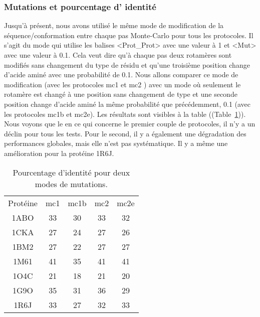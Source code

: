    \subsubsection{Mutations et pourcentage d' identité} 
Jusqu'à présent, nous avons utilisé le même mode de modification de la séquence/conformation entre chaque pas Monte-Carlo pour tous les protocoles. Il s'agit du mode qui utilise les balises <Prot\_Prot> avec une valeur à 1 et <Mut> avec une valeur à 0.1. Cela veut dire qu'à chaque pas deux rotamères sont modifiés sans changement du type de résidu et qu'une troisième position change d'acide aminé avec une probabilité de 0.1. Nous allons comparer ce mode de modification (avec les protocoles mc1 et mc2 ) avec un mode où seulement  le rotamère est changé à une position sans changement de type et une seconde position change d'acide aminé la même probabilité que précédemment, 0.1 (avec les protocoles mc1b et mc2e). Les résultats sont visibles à la table ((Table~\ref{tab:mut_ident})). Nous voyons que le en ce qui concerne le premier couple de protocoles, il n'y a un déclin pour tous les tests. Pour le second, il y a également une dégradation des performances globales, mais elle n'est pas systématique. Il y a même une amélioration pour la protéine 1R6J.  


    \begin{table}[!htbp]
      \centering
      
      \begin{tabular}{ccccc}      
          \toprule
          Protéine & mc1 & mc1b & mc2 & mc2e \\
          \cmidrule{1-3}
          
          1ABO & 33 & 30 & 33 & 32 \\      
          1CKA & 27 & 24 & 27 & 26 \\
          1BM2 & 27 & 22 & 27 & 27 \\
          1M61 & 41 & 35 & 41 & 41 \\
          1O4C & 21 & 18 & 21 & 20 \\
          1G9O & 35 & 31 & 36 & 29 \\
          1R6J & 33 & 27 & 32 & 33 \\ 
          \bottomrule
          
        \end{tabular}
        
        \caption{Pourcentage d'identité pour deux modes de mutations. }      
\label{tab:mut_ident}        
        \end{table}


